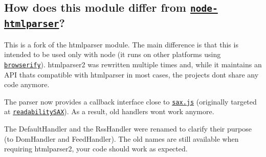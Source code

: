 \subsection*{How does this module differ from \href{https://github.com/tautologistics/node-htmlparser}{\tt node-\/htmlparser}?}

This is a fork of the {\ttfamily htmlparser} module. The main difference is that this is intended to be used only with node (it runs on other platforms using \href{https://github.com/substack/node-browserify}{\tt browserify}). {\ttfamily htmlparser2} was rewritten multiple times and, while it maintains an A\+PI that\textquotesingle{}s compatible with {\ttfamily htmlparser} in most cases, the projects don\textquotesingle{}t share any code anymore.

The parser now provides a callback interface close to \href{https://github.com/isaacs/sax-js}{\tt sax.\+js} (originally targeted at \href{https://github.com/fb55/readabilitysax}{\tt readability\+S\+AX}). As a result, old handlers won\textquotesingle{}t work anymore.

The {\ttfamily Default\+Handler} and the {\ttfamily Rss\+Handler} were renamed to clarify their purpose (to {\ttfamily Dom\+Handler} and {\ttfamily Feed\+Handler}). The old names are still available when requiring {\ttfamily htmlparser2}, your code should work as expected. 